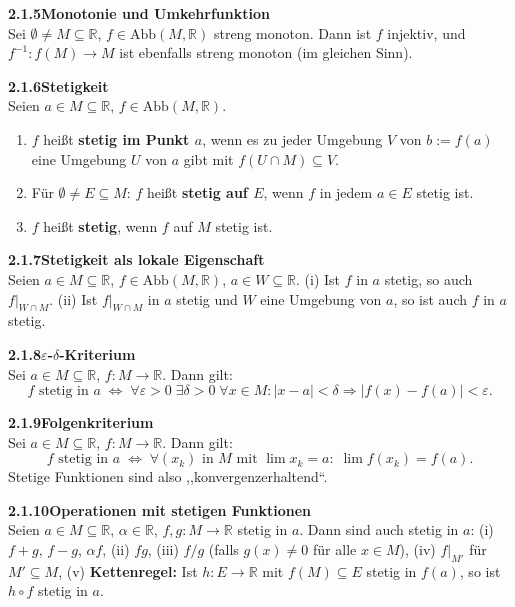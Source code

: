 \documentclass[a4paper,12pt]{article}
\newcommand{\gentry}[3]{%
  \noindent\textbf{#1\quad #2}\nopagebreak\\[0.2em]
  #3\par\smallskip
}
\begin{document}
\gentry{2.1.5}{Monotonie und Umkehrfunktion}{%
  Sei $\emptyset \neq M \subseteq \mathbb{R}$, $f \in \mathrm{Abb}(M, \mathbb{R})$
  streng monoton. Dann ist $f$ injektiv, und $f^{-1}: f(M) \to M$ ist ebenfalls
  streng monoton (im gleichen Sinn).
}

\gentry{2.1.6}{Stetigkeit}{%
  Seien $a \in M \subseteq \mathbb{R}$, $f \in \mathrm{Abb}(M, \mathbb{R})$.
  \begin{enumerate}[label=(\roman*),topsep=2pt,itemsep=1pt]
    \item $f$ heißt \textbf{stetig im Punkt $a$}, wenn es zu jeder Umgebung $V$
          von $b := f(a)$ eine Umgebung $U$ von $a$ gibt mit $f(U \cap M) \subseteq V$.
    \item Für $\emptyset \neq E \subseteq M$: $f$ heißt \textbf{stetig auf $E$},
          wenn $f$ in jedem $a \in E$ stetig ist.
    \item $f$ heißt \textbf{stetig}, wenn $f$ auf $M$ stetig ist.
  \end{enumerate}
}

\gentry{2.1.7}{Stetigkeit als lokale Eigenschaft}{%
  Seien $a \in M \subseteq \mathbb{R}$, $f \in \mathrm{Abb}(M, \mathbb{R})$, $a \in W \subseteq \mathbb{R}$.
  (i) Ist $f$ in $a$ stetig, so auch $f|_{W \cap M}$.
  (ii) Ist $f|_{W \cap M}$ in $a$ stetig und $W$ eine Umgebung von $a$, so ist
  auch $f$ in $a$ stetig.
}

\gentry{2.1.8}{$\varepsilon$-$\delta$-Kriterium}{%
  Sei $a \in M \subseteq \mathbb{R}$, $f: M \to \mathbb{R}$. Dann gilt:
  \[
    f \text{ stetig in } a \;\Longleftrightarrow\;
    \forall \varepsilon > 0\;\exists \delta > 0\;\forall x \in M:
    |x - a| < \delta \Rightarrow |f(x) - f(a)| < \varepsilon.
  \]
}

\gentry{2.1.9}{Folgenkriterium}{%
  Sei $a \in M \subseteq \mathbb{R}$, $f: M \to \mathbb{R}$. Dann gilt:
  \[
    f \text{ stetig in } a \;\Longleftrightarrow\;
    \forall (x_k) \text{ in } M \text{ mit } \lim x_k = a:\; \lim f(x_k) = f(a).
  \]
  Stetige Funktionen sind also ,,konvergenzerhaltend``.
}

\gentry{2.1.10}{Operationen mit stetigen Funktionen}{%
  Seien $a \in M \subseteq \mathbb{R}$, $\alpha \in \mathbb{R}$, $f, g: M \to \mathbb{R}$ stetig in $a$.
  Dann sind auch stetig in $a$:
  (i) $f + g$, $f - g$, $\alpha f$, \quad
  (ii) $fg$, \quad
  (iii) $f/g$ (falls $g(x) \neq 0$ für alle $x \in M$), \quad
  (iv) $f|_{M'}$ für $M' \subseteq M$, \quad
  (v) \textbf{Kettenregel:} Ist $h: E \to \mathbb{R}$ mit $f(M) \subseteq E$ stetig in $f(a)$,
  so ist $h \circ f$ stetig in $a$.
}
\end{document}
